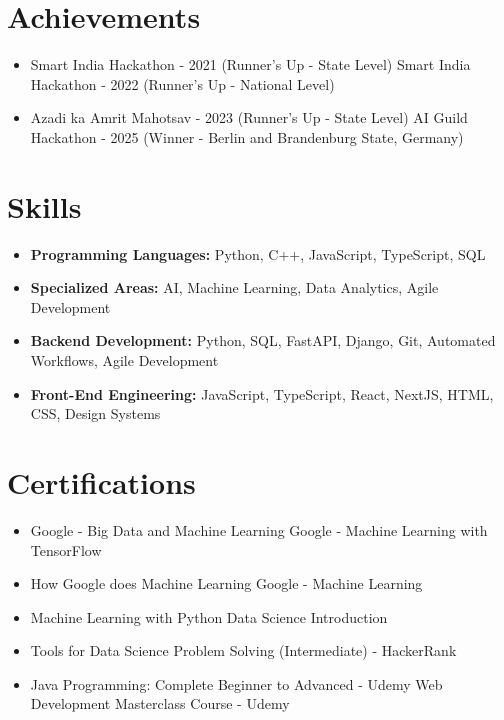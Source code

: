 \documentclass[a4paper,10pt]{article}
\begin{document}
\section*{Achievements}
\begin{itemize}
\item Smart India Hackathon - 2021 (Runner's Up - State Level) \hfill Smart India Hackathon - 2022 (Runner's Up - National Level)
\item Azadi ka Amrit Mahotsav - 2023 (Runner's Up - State Level) \hfill AI Guild Hackathon - 2025 (Winner - Berlin and Brandenburg State, Germany)
\end{itemize}

\section*{Skills}
\begin{itemize}
  \item \textbf{Programming Languages:} Python, C++, JavaScript, TypeScript, SQL
  \item \textbf{Specialized Areas:} AI, Machine Learning, Data Analytics, Agile Development
  \item \textbf{Backend Development:} Python, SQL, FastAPI, Django, Git, Automated Workflows, Agile Development
  \item \textbf{Front-End Engineering:} JavaScript, TypeScript, React, NextJS, HTML, CSS, Design Systems
\end{itemize}

\section*{Certifications}
\begin{itemize}
\item Google - Big Data and Machine Learning \hfill Google - Machine Learning with TensorFlow
\item How Google does Machine Learning \hfill Google - Machine Learning
\item Machine Learning with Python \hfill Data Science Introduction
\item Tools for Data Science \hfill Problem Solving (Intermediate) - HackerRank
\item Java Programming: Complete Beginner to Advanced - Udemy \hfill Web Development Masterclass Course - Udemy
\end{itemize}
\end{document}
